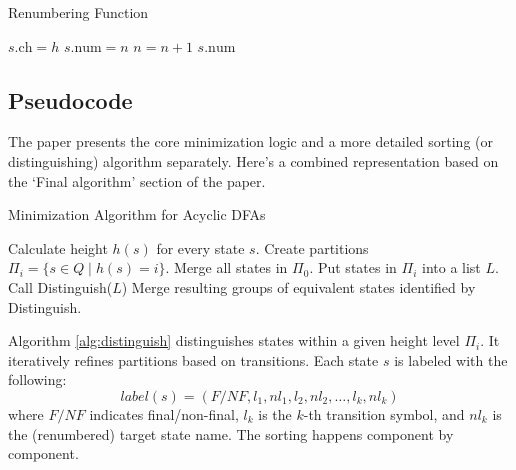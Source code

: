 \begin{algorithm}
    \caption{Renumbering Function}
    \begin{algorithmic}[1]
                \State $s.\text{ch} = h$
                \State $s.\text{num} = n$
                \State $n = n + 1$
            \EndIf
            \State \Return $s.\text{num}$
        \EndFunction
    \end{algorithmic}
\end{algorithm}

\subsection{Pseudocode}
The paper presents the core minimization logic and a more detailed sorting (or distinguishing) algorithm separately. Here's a combined representation based on the `Final algorithm' section of the paper.

\begin{algorithm}
    \caption{Minimization Algorithm for Acyclic DFAs}  
    \begin{algorithmic}[1]
    \State Calculate height $h(s)$ for every state $s$.
    \State Create partitions $\Pi_i = \{s \in Q \mid h(s) = i\}$.
    \State Merge all states in $\Pi_0$.
     
        \State {}
        \State Put states in $\Pi_i$ into a list $L$. 
        \State Call Distinguish($L$)
        \State Merge resulting groups of equivalent states identified by Distinguish.
    \EndFor
    \end{algorithmic}
\end{algorithm}

Algorithm \ref{alg:distinguish} distinguishes states within a given height level $\Pi_i$. It iteratively refines partitions based on transitions. Each state $s$ is labeled with the following:
$$label(s) = (F/NF, l_1, nl_1, l_2, nl_2, \dots, l_k, nl_k)$$
where $F/NF$ indicates final/non-final, $l_k$ is the $k$-th transition symbol, and $nl_k$ is the (renumbered) target state name. The sorting happens component by component.

